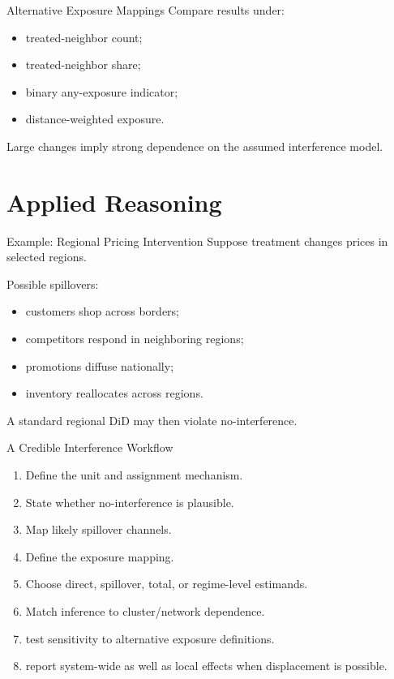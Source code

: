 \documentclass[aspectratio=169,11pt]{beamer}
\begin{document}
\begin{frame}{Alternative Exposure Mappings}
Compare results under:
\begin{itemize}
\item treated-neighbor count;
\item treated-neighbor share;
\item binary any-exposure indicator;
\item distance-weighted exposure.
\end{itemize}

Large changes imply strong dependence on the assumed interference model.
\end{frame}

\section{Applied Reasoning}

\begin{frame}{Example: Regional Pricing Intervention}
Suppose treatment changes prices in selected regions.

Possible spillovers:
\begin{itemize}
\item customers shop across borders;
\item competitors respond in neighboring regions;
\item promotions diffuse nationally;
\item inventory reallocates across regions.
\end{itemize}

A standard regional DiD may then violate no-interference.
\end{frame}

\begin{frame}{A Credible Interference Workflow}
\begin{enumerate}
\item Define the unit and assignment mechanism.
\item State whether no-interference is plausible.
\item Map likely spillover channels.
\item Define the exposure mapping.
\item Choose direct, spillover, total, or regime-level estimands.
\item Match inference to cluster/network dependence.
\item test sensitivity to alternative exposure definitions.
\item report system-wide as well as local effects when displacement is possible.
\end{enumerate}
\end{frame}
\end{document}
